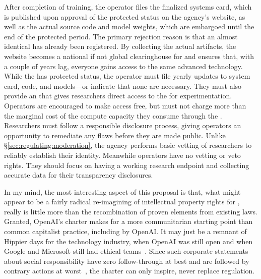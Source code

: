 After completion of training, the operator files the finalized systems card,
which is published upon approval of the protected status on the agency's
website, as well as the actual source code and model weights, which are
embargoed until the end of the protected period. The primary rejection reason is
that an almost identical  has already been registered. By collecting the
actual artifacts, the  website becomes a national if not global
clearinghouse for  and ensures that, with a couple of years lag, everyone
gains access to the same advanced technology. While the  has protected
status, the operator must file yearly updates to system card, code, and
models---or indicate that none are necessary. They must also provide an 
that gives  researchers direct access to the  for experimentation.
Operators are encouraged to make  access free, but must not charge more
than the marginal cost of the compute capacity they consume through the .
Researchers must follow a responsible disclosure process, giving operators an
opportunity to remediate any flaws before they are made public. Unlike
\S\ref{sec:regulating:moderation}, the  agency performs basic vetting of
researchers to reliably establish their identity. Meanwhile operators have no
vetting or veto rights. They should focus on having a working research endpoint
and collecting accurate data for their transparency disclosures.

In my mind, the most interesting aspect of this proposal is that, what might
appear to be a fairly radical re-imagining of intellectual property rights for
, really is little more than the recombination of proven elements from
existing  laws. Granted, OpenAI's charter makes for a more communitarian
starting point than common capitalist practice, including by OpenAI. It may just
be a remnant of Hippier days for the technology industry, when OpenAI was still
open and when Google and Microsoft still had ethical 
teams~\cite{GrantBassea2021,GrantEidelson2022,Newton2023}. Since such corporate
statements about social responsibility have zero follow-through at best and are
followed by contrary actions at
worst~\cite{BebchukKastielea2022,RaghunandanRajgopal2022,Useem2020}, the charter
can only inspire, never replace regulation.

